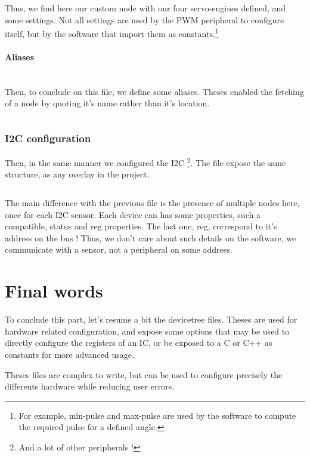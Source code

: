 \inputminted[linenos, firstline=52, lastline=66]{devicetree}{data/code/dtc/topaze-pwm-servo.dtsi}

Thus, we find here our custom node with our four servo-engines defined, and some settings.
Not all settings are used by the PWM peripheral to configure itself, but by the software that 
import them as constants.\footnote{
    For example, min-pulse and max-pulse are used by the software to compute the required 
    pulse for a defined angle.
}

\paragraph{Aliases} ~\\
Then, to conclude on this file, we define some aliases. Theses enabled the fetching of a node by quoting
it's name rather than it's location. 

\inputminted[linenos, firstline=69, lastline=74]{devicetree}{data/code/dtc/topaze-pwm-servo.dtsi}

\subsubsection{I2C configuration}
Then, in the same manner we configured the I2C \footnote{
    And a lot of other peripherals !
}. The file expose the same structure, as any overlay in the project. 

\inputminted[linenos, firstline=36, lastline=61]{devicetree}{data/code/dtc/topaze-I2C.dtsi}

The main difference with the previous file is the presence of multiple nodes here, once for each I2C sensor.
Each device can has some properties, such a compatible, status and reg properties. The last one, reg, 
correspond to it's address on the bus ! Thus, we don't care about such details on the software, we communicate
with a sensor, not a peripheral on some address.

\section{Final words}
To conclude this part, let's resume a bit the devicetree files. Theses are used for hardware related configuration, 
and expose some options that may be used to directly configure the registers of an IC, or be exposed to a C or C++ 
as constants for more advanced usage.

Theses files are complex to write, but can be used to configure precisely the differents hardware while reducing 
user errors.
